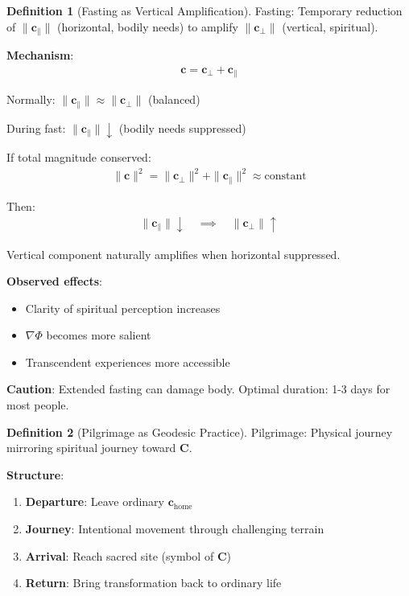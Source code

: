 \documentclass[11pt,a4paper]{article}
\theoremstyle{definition}
\newtheorem{definition}{Definition}[section]
\theoremstyle{remark}
\newcommand{\cc}{\mathbf{c}}
\begin{document}
\begin{enumerate}
\begin{protocol}
\begin{definition}[Fasting as Vertical Amplification]
Fasting: Temporary reduction of \(\|\cc_\parallel\|\) (horizontal, bodily needs) to amplify \(\|\cc_\perp\|\) (vertical, spiritual).

\textbf{Mechanism}:
\begin{align}
\cc = \cc_\perp + \cc_\parallel
\end{align}

Normally: \(\|\cc_\parallel\| \approx \|\cc_\perp\|\) (balanced)

During fast: \(\|\cc_\parallel\| \downarrow\) (bodily needs suppressed)

If total magnitude conserved:
\begin{align}
\|\cc\|^2 = \|\cc_\perp\|^2 + \|\cc_\parallel\|^2 \approx \text{constant}
\end{align}

Then:
\begin{align}
\|\cc_\parallel\| \downarrow \quad \implies \quad \|\cc_\perp\| \uparrow
\end{align}

Vertical component naturally amplifies when horizontal suppressed.

\textbf{Observed effects}:
\begin{itemize}
    \item Clarity of spiritual perception increases
    \item \(\nabla \Phi\) becomes more salient
    \item Transcendent experiences more accessible
\end{itemize}

\textbf{Caution}: Extended fasting can damage body. Optimal duration: 1-3 days for most people.
\end{definition}

\begin{definition}[Pilgrimage as Geodesic Practice]
Pilgrimage: Physical journey mirroring spiritual journey toward \(\mathbf{C}\).

\textbf{Structure}:
\begin{enumerate}
    \item \textbf{Departure}: Leave ordinary \(\cc_{\text{home}}\)
    \item \textbf{Journey}: Intentional movement through challenging terrain
    \item \textbf{Arrival}: Reach sacred site (symbol of \(\mathbf{C}\))
    \item \textbf{Return}: Bring transformation back to ordinary life
\end{enumerate}


\end{definition}
\end{protocol}
\end{enumerate}
\end{document}
